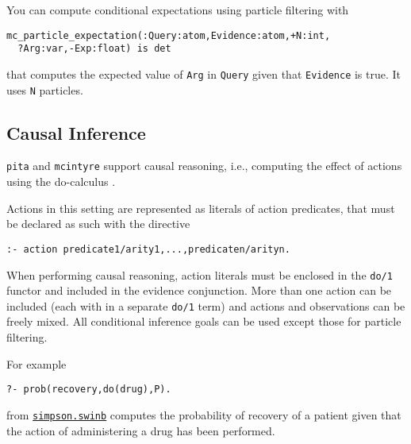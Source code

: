 You can compute conditional expectations using particle filtering with
\begin{verbatim}
mc_particle_expectation(:Query:atom,Evidence:atom,+N:int,
  ?Arg:var,-Exp:float) is det
\end{verbatim}
that computes the expected value of \verb|Arg| in \verb|Query| given that
\verb|Evidence| is true.
It uses \verb|N| particles.

\subsection{Causal Inference}
\label{causal}

\verb|pita| and \verb|mcintyre| support causal reasoning, i.e., computing the effect of actions using the
do-calculus \cite{Pea00-book}.

Actions in this setting are represented as literals of action predicates, that must be declared as such
with the directive
\begin{verbatim}
:- action predicate1/arity1,...,predicaten/arityn.
\end{verbatim}
When performing causal reasoning, action literals must be enclosed in the \verb|do/1| functor and included in the evidence conjunction. More than one action can be included (each with in a separate
\verb|do/1| term) and actions and observations can be freely mixed.
All conditional inference goals can be used except those for particle filtering.

For example
\begin{verbatim}
?- prob(recovery,do(drug),P).
\end{verbatim}
from \href{http://cplint.eu/example/inference/simpson.swinb}{\texttt{simpson.swinb}}
computes the probability of recovery of a patient given that the action of administering a drug has
been performed.
